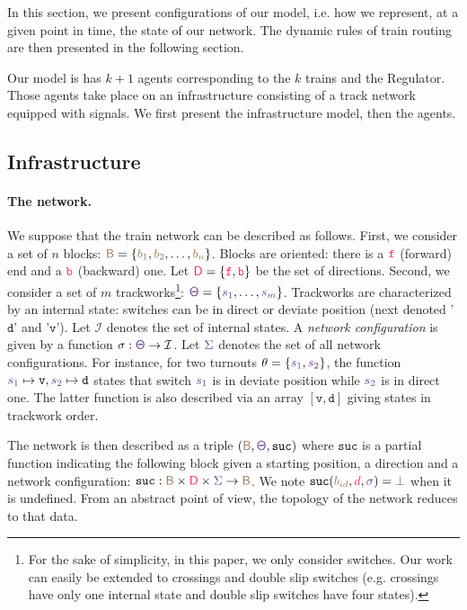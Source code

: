 \documentclass[runningheads]{llncs}
\newcommand{\directions}{\dirFmt{\mathsf{D}}}
\newcommand{\internalState}{{\mathcal{I}}}
\newcommand{\forward}{\ensuremath{\mathtt{f}}}
\newcommand{\backward}{\ensuremath{\mathtt{b}}\xspace}
\newcommand{\sucblock}{{\mathtt{suc}}}
\newcommand{\dirFmt}[1]{{\color{dircolor} #1}}
\newcommand{\dirForward}{\ensuremath{\dirFmt{\forward}}\xspace}
\newcommand{\dirBackward}{\ensuremath{\dirFmt{\backward}}\xspace}
\newcommand{\posFmt}[1]{{\color{poscolor}{#1}}}
\newcommand{\blocks}{{\posFmt{\mathsf{B}}}}
\newcommand{\bid}[1]{\ensuremath{\posFmt{b_{#1}}}}
\newcommand{\suc}[3]{\ensuremath{\sucblock(\posFmt{#1}, \dirFmt{#2}, \swFmt{#3})}}
\newcommand{\swFmt}[1]{{\color{swcolor}{#1}}}
\newcommand{\sid}[1]{\ensuremath{\swFmt{s_{#1}}}}
\newcommand{\turnouts}{\swFmt{\mathsf{\Theta}}}
\newcommand{\switches}{\ensuremath{\swFmt{\sigma}}}
\newcommand{\networkConf}{\ensuremath{\swFmt{\Sigma}}}
\newcommand{\nosuc}{\ensuremath{\swFmt{\bot}}}
\newcommand{\deviate}{{\mbox{$\mathtt{v}$}}\xspace}
\newcommand{\direct}{{\mbox{$\mathtt{d}$}}\xspace}
\begin{document}
In this section, we present configurations of our model, i.e. how we represent, at a given point in time, the state of our network. The dynamic rules of train routing are then presented in the following section.

Our model is has $k+1$ agents corresponding to the $k$ trains and the Regulator. Those agents take place on an infrastructure consisting of a track network equipped with signals. We first present the infrastructure model, then the agents.

\subsection{Infrastructure}

\paragraph{The network.} 

We suppose that the train network can be described as follows. First, we consider a set of $n$ blocks: $\blocks = \{ \bid{1}, \bid{2}, \ldots, \bid{n}\}$. Blocks are oriented: there is a $\dirForward$ (forward) end and a $\dirBackward$ (backward) one. Let $\directions = \{\dirForward, \dirBackward\}$ be the set of directions.  Second, we consider a set of $m$ trackworks\footnote{For the sake of simplicity, in this paper, we only consider switches. Our work can easily be extended to crossings and double slip switches (e.g. crossings have only one internal state and double slip switches have four states).}: $\turnouts = \{\sid{1}, \ldots, \sid{m}\}$. Trackworks are characterized by an internal state: switches can be in direct or deviate position (next denoted '\direct' and '\deviate'). Let $\internalState$ denotes the set of internal states. A \emph{network configuration} is given by a function $\sigma: \turnouts \to \internalState$. Let $\networkConf$ denotes the set of all network configurations. For instance, for two turnouts $\theta = \{\sid{1}, \sid{2}\}$, the function $\sid{1} \mapsto \deviate, \sid{2} \mapsto \direct$ states that switch $\sid{1}$ is in deviate position while \sid{2} is in direct one. The latter function is also described via an array  $[\deviate, \direct]$ giving states in trackwork order.

The network is then described as a triple $(\blocks, \turnouts, \sucblock)$ where $\sucblock$ is a partial function indicating the following block given a starting position, a direction and a network configuration: $\sucblock: \blocks\times \directions \times \networkConf \to \blocks$. We note $\suc{\bid{id}}{d}{\switches} = \nosuc$ when it is undefined. From an abstract point of view, the topology of the network reduces to that data.  
\end{document}
